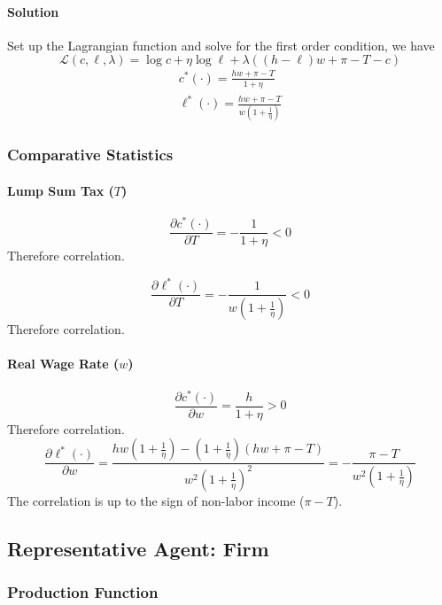 \documentclass[11pt]{article}
\newcommand{\pd}[2]{\frac{\partial{#1}}{\partial{#2}}}
\begin{document}
\paragraph{Solution} Set up the Lagrangian function and solve for the first order condition, we have
\[
	\mathcal{L}(c, \ell, \lambda) = \log{c} + \eta \log{\ell} + \lambda ((h-\ell)w+\pi-T - c)
\]
\begin{align}
	c^*(\cdot) = \frac{hw + \pi - T}{1 + \eta} \\
	\ell^* (\cdot) = \frac{hw + \pi - T}{w (1 + \frac{1}{\eta})}
\end{align}

\subsubsection{Comparative Statistics}
\paragraph{Lump Sum Tax ($T$)}
\begin{equation}
	\pd{c^*(\cdot)}{T} = -\frac{1}{1+\eta} < 0
\end{equation}
Therefore  correlation.

\begin{equation}
	\pd{\ell^* (\cdot)}{T} = -\frac{1}{w(1+\frac{1}{\eta})} < 0
\end{equation}
Therefore  correlation.

\paragraph{Real Wage Rate ($w$)}
\begin{equation}
	\pd{c^*(\cdot)}{w} = \frac{h}{1+\eta} > 0
\end{equation}
Therefore  correlation.
\begin{equation}
	\pd{\ell^*(\cdot)}{w} = \frac{hw(1+ \frac{1}{\eta}) - (1+\frac{1}{\eta})(hw+\pi-T)}{w^2 (1+\frac{1}{\eta})^2} = -\frac{\pi - T}{w^2(1+\frac{1}{\eta})}
\end{equation}
The correlation is up to the sign of non-labor income ($\pi - T$).

\subsection{Representative Agent: Firm}
\subsubsection{Production Function}
\end{document}
